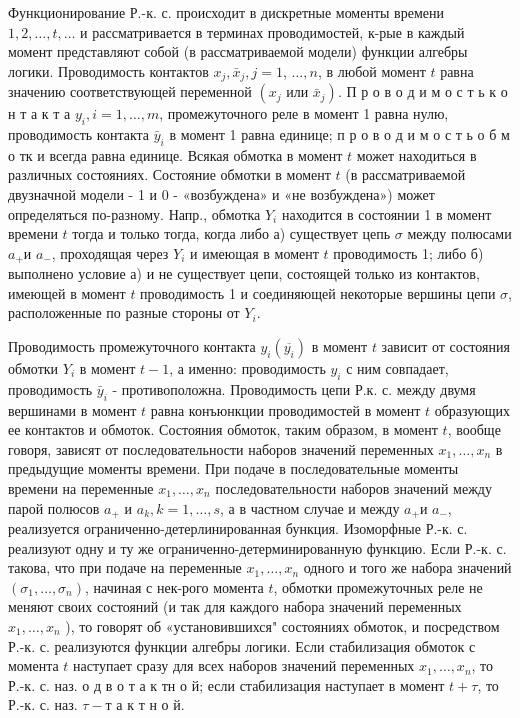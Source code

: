 \documentclass[10pt]{article}
\begin{document}
Функционирование Р.-к. с. происходит в дискретные моменты времени $1,2, \ldots, t, \ldots$ и рассматривается в терминах проводимостей, к-рые в каждый момент представляют собой (в рассматриваемой модели) функции алгебры логики. Проводимость контактов $x_{j}, \bar{x}_{j}, j=1$, $\ldots, n$, в любой момент $t$ равна значению соответствующей переменной $\left(x_{j}\right.$ или $\left.\bar{x}_{j}\right)$. П р о в о д и м о с т ь к о н т а к т а $y_{i}, i=1, \ldots, m$, промежуточного реле в момент 1 равна нулю, проводимость контакта $\bar{y}_{i}$ в момент 1 равна единице; п р о в о д и м о с т ь о б м о тк и всегда равна единице. Всякая обмотка в момент $t$ может находиться в различных состояниях. Состояние обмотки в момент $t$ (в рассматриваемой двузначной модели - 1 и 0 - «возбуждена» и «не возбуждена») может определяться по-разному. Напр., обмотка $Y_{i}$ находится в состоянии 1 в момент времени $t$ тогда и только тогда, когда либо а) существует цепь $\sigma$ между полюсами $a_{+}$и $a_{-}$, проходящая через $Y_{i}$ и имеющая в момент $t$ проводимость 1; либо б) выполнено условие а) и не существует цепи, состоящей только из контактов, имеющей в момент $t$ проводимость 1 и соединяющей некоторые вершины цепи $\sigma$, расположенные по разные стороны от $Y_{i}$.



Проводимость промежуточного контакта $y_{i}\left(\overline{y_{i}}\right)$ в момент $t$ зависит от состояния обмотки $Y_{i}$ в момент $t-1$, а именно: проводимость $y_{i}$ с ним совпадает, проводимость $\bar{y}_{i}$ - противоположна. Проводимость цепи Р.к. с. между двумя вершинами в момент $t$ равна конъюнкции проводимостей в момент $t$ образующих ее контактов и обмоток. Состояния обмоток, таким образом, в момент $t$, вообще говоря, зависят от последовательности наборов значений переменных $x_{1}, \ldots, x_{n}$ в предыдущие моменты времени. При подаче в последовательные моменты времени на переменные $x_{1}, \ldots, x_{n}$ последовательности наборов значений между парой полюсов $a_{+}$ и $a_{k}, k=1, \ldots, s$, а в частном случае и между $a_{+}$и $a_{-}$, реализуется ограниченно-детерлинированная бункция. Изоморфные Р.-к. с. реализуют одну и ту же ограниченно-детерминированную функцию. Если Р.-к. с. такова, что при подаче на переменные $x_{1}, \ldots, x_{n}$ одного и того же набора значений $\left(\sigma_{1}, \ldots, \sigma_{n}\right)$, начиная с нек-рого момента $t$, обмотки промежуточных реле не меняют своих состояний (и так для каждого набора значений переменных $x_{1}, \ldots, x_{n}$ ), то говорят об «установившихся" состояниях обмоток, и посредством Р.-к. с. реализуются функции алгебры логики. Если стабилизация обмоток с момента $t$ наступает сразу для всех наборов значений переменных $x_{1}, \ldots, x_{n}$, то Р.-к. с. наз. о д в о т а к тн о й; если стабилизация наступает в момент $t+\tau$, то Р.-к. с. наз. $\tau-т$ а к т н о й.
\end{document}
